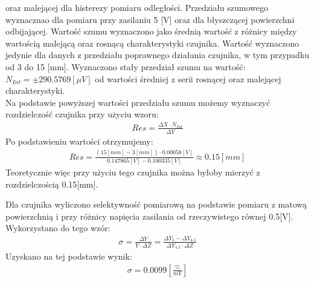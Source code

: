 \documentclass[11pt]{article}
\begin{document}
    oraz malejącej dla histerezy pomiaru odległości. Przedziału szumowego wyznacznao dla pomiaru przy zasilaniu 5 [V] oraz dla błyszczącej powierzchni
    odbijającej. Wartość szumu wyznaczono jako średnią wartość z różnicy między wartością malejącą oraz rosnącą charakterystyki czujnika. Wartość
    wyznaczono jedynie dla danych z przedziału poprawnego działania czujnika, w tym przypadku od 3 do 15 [mm]. Wyznaczono stały przedział
    szumu na wartość: $N_{Int}=\pm 290.5769 [\mu V]$ od wartości średniej z serii rosnącej oraz malejącej charakterystyki.\\
    \indent Na podstawie powyższej wartości przedziału szumu możemy wyznaczyć rozdzielczość czujnika przy użyciu wzoru:
    \begin{gather*}
        Res=\frac{\Delta X\cdot N_{Int}}{\Delta Y}
    \end{gather*}
    Po podstawieniu wartości otrzymujemy:
    \begin{gather*}
        Res=\frac{(15[mm]-3[mm])\cdot 0.00058[V]}{0.147865[V]-0.100335[V]}\approx 0.15[mm]
    \end{gather*}
    Teoretycznie więc przy użyciu tego czujnika można byłoby mierzyć z rozdzielczością 0.15[mm].
    \par Dla czujnika wyliczono selektywność pomiarową na podstawie pomiaru z matową powierzchnią i przy różnicy napięcia
    zasilania od rzeczywistego równej 0.5[V]. Wykorzystano do tego wzór:
    \begin{gather*}
        \sigma=\frac{\Delta Y}{Y\cdot \Delta Z}=\frac{\Delta Y_5 - \Delta Y_{4.5}}{\Delta Y_{4.5} \cdot \Delta Z}
    \end{gather*}
    Uzyskano na tej podstawie wynik:
    \begin{gather*}
        \sigma=0.0099 [\frac{\%}{mV}]
    \end{gather*}
\end{document}
